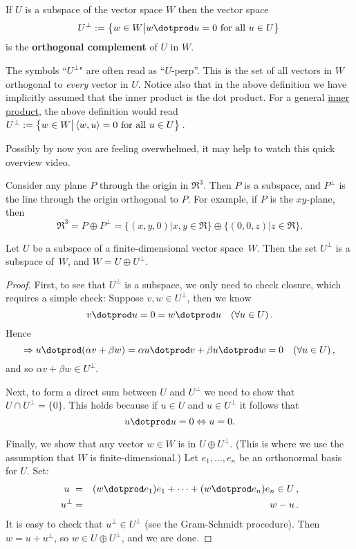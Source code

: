 \begin{definition}
If $U$ is a subspace of the vector space $W$ then the vector space 
\[U^\perp := \big\{w\in W \big| w\dotprod u=0 \text{ for all } u\in U\big\}\, \]
is the {\bf orthogonal complement} of $U$ in $W$. 
\end{definition}


\begin{remark}
The symbols ``$U^\perp$" are often read as ``$U$-perp''.  This is the set of all vectors in $W$ orthogonal to \emph{every} vector in $U$. 
Notice also that in the above definition we have implicitly assumed that the inner product is the dot product. For a general \hyperlink{inner_product}{inner product}, the  
above definition would read $U^\perp := \big\{w\in W \big|\,  \langle w,u\rangle=0 \ {\rm  for\  all } \ u\in U\big\}\, $.
\end{remark}
Possibly by now you are feeling overwhelmed, it may help to watch this quick overview video.




\begin{example}
Consider any plane $P$ through the origin in $\Re^3$.  Then $P$ is a subspace, and $P^\perp$ is the line through the origin orthogonal to $P$.  For example, if $P$ is the $xy$-plane, then
\[
\Re^3=P\oplus P^\perp=\{(x,y,0)| x,y\in \Re \} \oplus \{(0,0,z)| z\in \Re \}.
\]
\end{example}

\begin{theorem}
Let $U$ be a subspace of a finite-dimensional vector space~$W$.  Then the set $U^\perp$ is a subspace of~$W$, and $W=U\oplus U^\perp$.
\end{theorem}

\begin{proof}
First, to see that $U^\perp$ is a subspace, we only need to check closure, which requires a simple check:
Suppose $v,w\in U^\perp$, then we know  \[v\dotprod u = 0 = w\dotprod u \quad (\forall u\in U)\, .\]
Hence
\[\Rightarrow u\dotprod(\alpha v+\beta w)= \alpha u\dotprod v + \beta u\dotprod w =0\quad (\forall u\in U)\, ,\] 
and so $\alpha v+\beta w\in U^\perp$.

Next, to form a direct sum between $U$ and $U^\perp$ we need to show
that $U\cap U^\perp=\{0\}$. This holds because if $u\in U$ and $u\in U^\perp$ it follows that
\[
u\dotprod u = 0 \Leftrightarrow u=0.
\]

Finally, we show that any vector $w\in W$ is in $U\oplus U^\perp$.  (This is where we use the assumption that $W$ is finite-dimensional.)  Let $e_1, \ldots, e_n$ be an orthonormal basis for $U$.  Set: 
\begin{eqnarray*}
u\ &=&(w\dotprod e_1)e_1 + \cdots + (w\dotprod e_n)e_n \in U\, ,\\
u^\perp&=& w-u\, .
\end{eqnarray*}
It is easy to check that $u^\perp \in U^\perp$ (see the Gram-Schmidt procedure).  Then $w=u+u^\perp$, so $w\in U\oplus U^\perp$, and we are done.
\end{proof}

